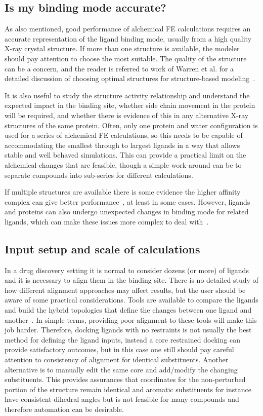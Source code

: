 \documentclass[9pt,bestpractices]{livecoms}
\begin{document}
\subsection{Is my binding mode accurate?}
As also mentioned, good performance of alchemical FE calculations requires an accurate representation of the ligand binding mode, usually from a high quality X-ray crystal structure. If more than one structure is available, the modeler should pay attention to choose the most suitable. The quality of the structure can be a concern, and the reader is referred to work of Warren et al. for a detailed discussion of choosing optimal structures for structure-based modeling~\cite{warren2012essential}.

It is also useful to study the structure activity relationship and understand the expected impact in the binding site, whether side chain movement in the protein will be required, and whether there is evidence of this in any alternative X-ray structures of the same protein. Often, only one protein and water configuration is used for a series of alchemical FE calculations, so this needs to be capable of accommodating the smallest through to largest ligands in a way that allows stable and well behaved simulations. This can provide a practical limit on the alchemical changes that are feasible, though a simple work-around can be to separate compounds into sub-series for different calculations. 

If multiple structures are available there is some evidence the higher affinity complex can give better performance~\cite{perez-benito2019predicting}, at least in some cases. However, ligands and proteins can also undergo unexpected changes in binding mode for related ligands, which can make these issues more complex to deal with~\cite{mey2016blinded}.

\subsection{Input setup and scale of calculations}
In a drug discovery setting it is normal to consider dozens (or more) of ligands and it is necessary to align them in the binding site. There is no detailed study of how different alignment approaches may affect results, but the user should be aware of some practical considerations. Tools are available to compare the ligands and build the hybrid topologies that define the changes between one ligand and another~\cite{loeffler2015fesetup,hedges2019biosimspace,gapsys2015pmx}. In simple terms, providing poor alignment to these tools will make this job harder. Therefore, docking ligands with no restraints is not usually the best method for defining the ligand inputs, instead a core restrained docking can provide satisfactory outcomes, but in this case one still should pay careful attention to consistency of alignment for identical substituents. Another alternative is to manually edit the same core and add/modify the changing substituents. This provides assurances that coordinates for the non-perturbed portion of the structure  remain identical and aromatic substituents for instance have consistent dihedral angles but is not feasible for many compounds and therefore automation can be desirable. 
\end{document}
